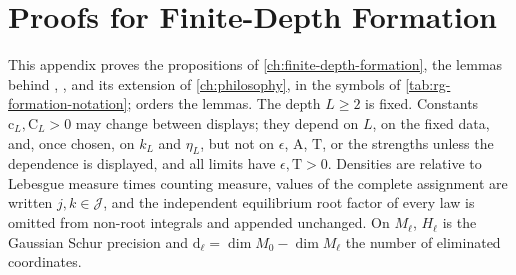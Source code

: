 \chapter{Proofs for Finite-Depth Formation}
\label{app:finite-depth-formation-proofs}

This appendix proves the propositions of \cref{ch:finite-depth-formation},
the lemmas behind ,
, and its extension
 of \cref{ch:philosophy}, in the symbols of
\cref{tab:rg-formation-notation}; 
orders the lemmas. The depth \(L\ge2\) is fixed. Constants
\(\mathrm c_L,\mathrm C_L>0\) may change between displays; they depend on
\(L\), on the fixed data, and, once chosen, on \(k_L\) and \(\eta_L\), but not
on \(\epsilon\), \(\mathrm A\), \(\mathrm T\), or the strengths unless the
dependence is displayed, and all limits have \(\epsilon,\mathrm T>0\).
Densities are relative to Lebesgue measure times counting measure, values of
the complete assignment are written \(j,k\in\mathcal J\), and the independent
equilibrium root factor of every law is omitted from non-root integrals and
appended unchanged. On \(M_\ell\), \(H_\ell\) is the Gaussian Schur precision
and \(\mathrm d_\ell=\dim M_0-\dim M_\ell\) the number of eliminated
coordinates.

